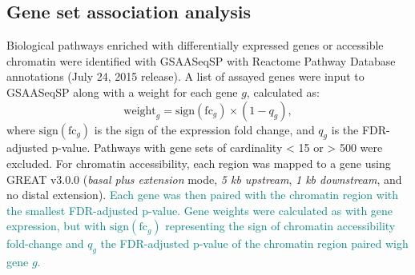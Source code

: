 \documentclass[9pt,twocolumn,twoside]{gsajnl}
\newcommand{\WVinline}[1]{\textcolor{red}{#1}}
\newcommand{\GKinline}[1]{\textcolor{teal}{#1}}
\begin{document}
\subsection{Gene set association analysis}

Biological pathways enriched with differentially expressed genes or accessible chromatin were identified with GSAASeqSP \citep{Xiong2014} with Reactome Pathway Database annotations (July 24, 2015 release). A list of assayed genes were input to GSAASeqSP along with a weight for each gene $g$, calculated as:
\begin{equation}
\text{weight}_{g} = \text{sign}(\text{fc}_{g}) \times (1-q_{g}),
\label{eq:gene_weighting}
\end{equation}
where $\text{sign}(\text{fc}_{g})$ is the sign of the expression fold change, and $q_{g}$ is the FDR-adjusted p-value. Pathways with gene sets of cardinality < 15 or > 500 were excluded. For chromatin accessibility, each region was mapped to a gene using GREAT v3.0.0 (\textit{basal plus extension} mode, \textit{5 kb upstream}, \textit{1 kb downstream}, and no distal extension). \GKinline{Each gene was then paired with the chromatin region with the smallest FDR-adjusted p-value. Gene weights were calculated as with gene expression, but with $\text{sign}(\text{fc}_{g})$ representing the sign of chromatin accessibility fold-change and $q_{g}$ the FDR-adjusted p-value of the chromatin region paired wigh gene $g$.}

\end{document}
